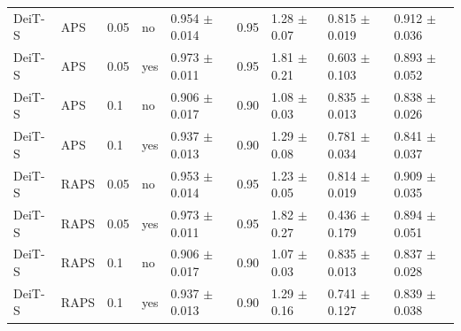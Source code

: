 \begin{table}[ht]
\begin{tabular}{lllllllll}
DeiT-S & APS & 0.05 & no & 0.954 $\pm$ 0.014 & 0.95 & 1.28 $\pm$ 0.07 & 0.815 $\pm$ 0.019 & 0.912 $\pm$ 0.036 \\
DeiT-S & APS & 0.05 & yes & 0.973 $\pm$ 0.011 & 0.95 & 1.81 $\pm$ 0.21 & 0.603 $\pm$ 0.103 & 0.893 $\pm$ 0.052 \\
DeiT-S & APS & 0.1 & no & 0.906 $\pm$ 0.017 & 0.90 & 1.08 $\pm$ 0.03 & 0.835 $\pm$ 0.013 & 0.838 $\pm$ 0.026 \\
DeiT-S & APS & 0.1 & yes & 0.937 $\pm$ 0.013 & 0.90 & 1.29 $\pm$ 0.08 & 0.781 $\pm$ 0.034 & 0.841 $\pm$ 0.037 \\
DeiT-S & RAPS & 0.05 & no & 0.953 $\pm$ 0.014 & 0.95 & 1.23 $\pm$ 0.05 & 0.814 $\pm$ 0.019 & 0.909 $\pm$ 0.035 \\
DeiT-S & RAPS & 0.05 & yes & 0.973 $\pm$ 0.011 & 0.95 & 1.82 $\pm$ 0.27 & 0.436 $\pm$ 0.179 & 0.894 $\pm$ 0.051 \\
DeiT-S & RAPS & 0.1 & no & 0.906 $\pm$ 0.017 & 0.90 & 1.07 $\pm$ 0.03 & 0.835 $\pm$ 0.013 & 0.837 $\pm$ 0.028 \\
DeiT-S & RAPS & 0.1 & yes & 0.937 $\pm$ 0.013 & 0.90 & 1.29 $\pm$ 0.16 & 0.741 $\pm$ 0.127 & 0.839 $\pm$ 0.038 \\
\hline
\end{tabular}
\end{table}